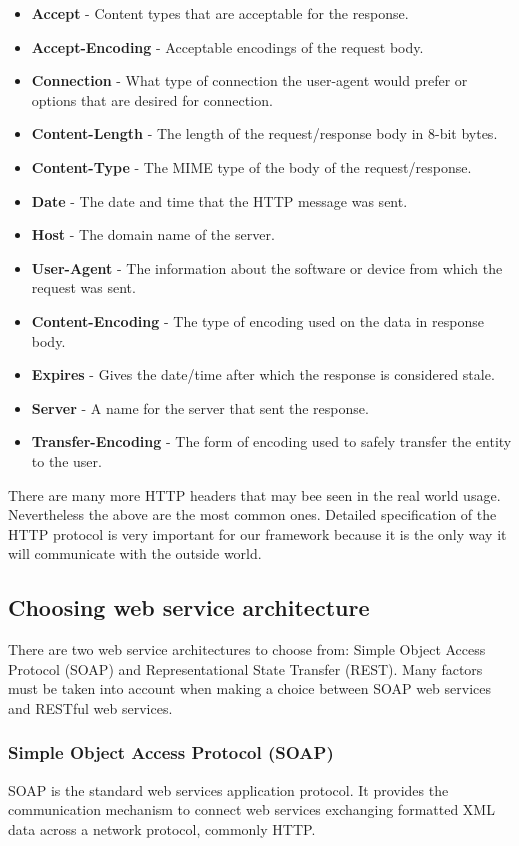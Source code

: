 \documentclass[thesis=M,english]{FITthesis}[2012/10/20]
\begin{document}
\begin{itemize}
\item \textbf{Accept} - Content types that are acceptable for the response.
\item \textbf{Accept-Encoding} - Acceptable encodings of the request body.
\item \textbf{Connection} - What type of connection the user-agent would prefer or options that are desired for connection.
\item \textbf{Content-Length} - The length of the request/response body in 8-bit bytes.
\item \textbf{Content-Type} - The MIME\cite{mime} type of the body of the request/response.
\item \textbf{Date} - The date and time that the HTTP message was sent.
\item \textbf{Host} - The domain name of the server.
\item \textbf{User-Agent} - The information about the software or device from which the request was sent.
\item \textbf{Content-Encoding} - The type of encoding used on the data in response body.
\item \textbf{Expires} - Gives the date/time after which the response is considered stale.
\item \textbf{Server} - A name for the server that sent the response.
\item \textbf{Transfer-Encoding} - The form of encoding used to safely transfer the entity to the user.
\end{itemize}

There are many more HTTP headers that may bee seen in the real world usage. Nevertheless the above are the most common ones. Detailed specification of the HTTP protocol is very important for our framework because it is the only way it will communicate with the outside world.

\subsection{Choosing web service architecture}
There are two web service architectures to choose from: Simple Object Access Protocol (SOAP) and Representational State Transfer (REST). Many factors must be taken into account when making a choice between SOAP web services and RESTful web services.

\subsubsection{Simple Object Access Protocol (SOAP)}
SOAP is the standard web services application protocol. It provides the communication mechanism to connect web services exchanging formatted XML data across a network protocol, commonly HTTP.\cite{java}
\end{document}
